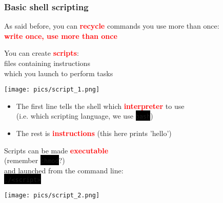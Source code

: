 \documentclass[unknownkeysallowed, 10pt, a4 paper, handout]{beamer}
\newcommand{\focus}[1]{\textbf{\textcolor{red}{#1}}}
\newcommand{\code}[1]{\colorbox{black}{\color{green}\texttt{#1}}}
\newcommand{\sidebyside}[5]{
  \begin{minipage}{#1\textwidth}
    #2
  \end{minipage} #3 \begin{minipage}{#4\textwidth}
    #5
  \end{minipage}
}
\begin{document}
\begin{frame}
  \begin{center}
    \frametitle{Basic shell scripting}

    As said before, you can \focus{recycle} commands you use more than once:\\
    \focus{write once, use more than once}

    \sidebyside{0.50}{
      You can create \focus{scripts}:\\
      files containing instructions\\
      which you launch to perform tasks
    }{\hfill}{0.45}{
      \begin{center}
        \texttt{[image: pics/script\_1.png]}
      \end{center}
    }

    \begin{itemize}
      \item The first line tells the shell which \focus{interpreter} to use\\
        (i.e. which scripting language, we use \code{bash})
      \item The rest is \focus{instructions} (this here prints 'hello')
    \end{itemize}

    \sidebyside{0.50}{
      Scripts can be made \focus{executable}\\
      (remember \code{chmod}?)\\
      and launched from the command line:\\
      \code{./<script>}
    }{\hfill}{0.45}{
      \begin{center}
        \texttt{[image: pics/script\_2.png]}
      \end{center}
    }
  \end{center}
\end{frame}
\end{document}
